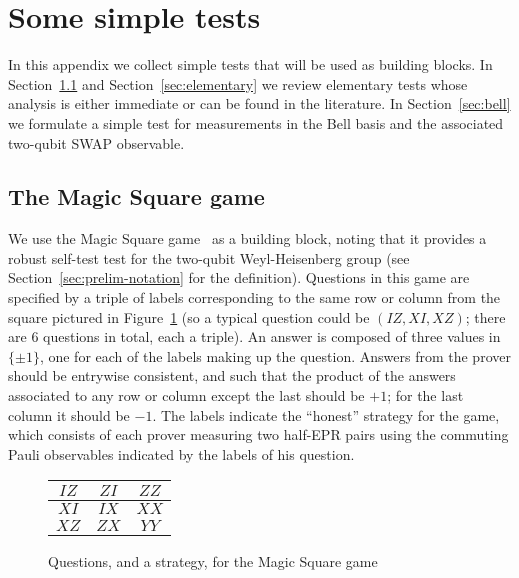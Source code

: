 

\section{Some simple tests}
\label{sec:clifford-test}

In this appendix we collect simple tests that will be used as building blocks. In Section~\ref{sec:ms} and Section~\ref{sec:elementary} we review elementary tests whose analysis is either immediate or can be found in the literature. In Section~\ref{sec:bell} we formulate a simple test for measurements in the Bell basis and the associated two-qubit SWAP observable. 


\subsection{The Magic Square game}
\label{sec:ms}

We use the Magic Square game~\cite{Mermin90} as a building block, noting that it  provides a robust self-test test for the two-qubit Weyl-Heisenberg group (see Section~\ref{sec:prelim-notation} for the definition). Questions in this game are specified by a triple of labels corresponding to the same row or column from the square pictured in Figure~\ref{fig:ms} (so a typical question could be $(IZ,XI,XZ)$; there are $6$ questions in total, each a triple). An answer is composed of three values in $\{\pm 1\}$, one for each of the labels making up the question. Answers from the prover should be entrywise consistent, and such that the product of the answers associated to any row or column except the last should be $+1$; for the last column it should be $-1$. The labels indicate the ``honest'' strategy for the game, which consists of each prover measuring two half-EPR pairs using the commuting Pauli observables indicated by the labels of his question. 

\begin{figure}[H]
\begin{center}
\begin{tabular}{|c|c|c|}
\hline
$IZ$ & $ZI$ & $ZZ$ \\
\hline
$XI$ & $IX$ & $XX$ \\
\hline
$XZ$ & $ZX$ & $YY$\\
\hline
\end{tabular}
\end{center}
\caption{Questions, and a strategy, for the Magic Square game}
\label{fig:ms}
\end{figure}

